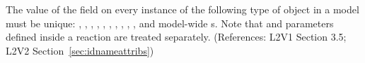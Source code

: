 The value of the  field on every instance of the
following type of object in a model must be unique: \Model,
\FunctionDefinition, \CompartmentType, \Compartment, \SpeciesType,
\Species, \Reaction, \SpeciesReference, \ModifierSpeciesReference,
\Event, and model-wide \Parameter{}s.  Note that \UnitDefinition
and parameters defined inside a reaction are treated separately.
(References: L2V1 Section 3.5; L2V2
Section~\ref{sec:idnameattribs})
